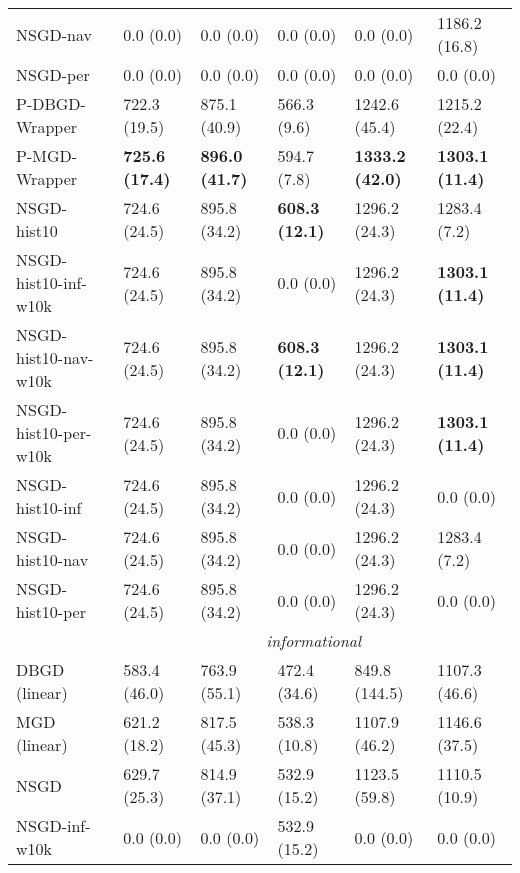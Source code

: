 \begin{tabular*}{\textwidth}{@{\extracolsep{\fill} } l  l l l l l  }
NSGD-nav & 0.0 {\tiny (0.0)} & 0.0 {\tiny (0.0)} & 0.0 {\tiny (0.0)} & 0.0 {\tiny (0.0)} & 1186.2 {\tiny (16.8)} \\
NSGD-per & 0.0 {\tiny (0.0)} & 0.0 {\tiny (0.0)} & 0.0 {\tiny (0.0)} & 0.0 {\tiny (0.0)} & 0.0 {\tiny (0.0)} \\
P-DBGD-Wrapper & 722.3 {\tiny (19.5)} & 875.1 {\tiny (40.9)} & 566.3 {\tiny (9.6)} & 1242.6 {\tiny (45.4)} & 1215.2 {\tiny (22.4)} \\
P-MGD-Wrapper & \bf 725.6 {\tiny (17.4)} & \bf 896.0 {\tiny (41.7)} & 594.7 {\tiny (7.8)} & \bf 1333.2 {\tiny (42.0)} & \bf 1303.1 {\tiny (11.4)} \\
NSGD-hist10 & 724.6 {\tiny (24.5)} & 895.8 {\tiny (34.2)} & \bf 608.3 {\tiny (12.1)} & 1296.2 {\tiny (24.3)} & 1283.4 {\tiny (7.2)} \\
NSGD-hist10-inf-w10k & 724.6 {\tiny (24.5)} & 895.8 {\tiny (34.2)} & 0.0 {\tiny (0.0)} & 1296.2 {\tiny (24.3)} & \bf 1303.1 {\tiny (11.4)} \\
NSGD-hist10-nav-w10k & 724.6 {\tiny (24.5)} & 895.8 {\tiny (34.2)} & \bf 608.3 {\tiny (12.1)} & 1296.2 {\tiny (24.3)} & \bf 1303.1 {\tiny (11.4)} \\
NSGD-hist10-per-w10k & 724.6 {\tiny (24.5)} & 895.8 {\tiny (34.2)} & 0.0 {\tiny (0.0)} & 1296.2 {\tiny (24.3)} & \bf 1303.1 {\tiny (11.4)} \\
NSGD-hist10-inf & 724.6 {\tiny (24.5)} & 895.8 {\tiny (34.2)} & 0.0 {\tiny (0.0)} & 1296.2 {\tiny (24.3)} & 0.0 {\tiny (0.0)} \\
NSGD-hist10-nav & 724.6 {\tiny (24.5)} & 895.8 {\tiny (34.2)} & 0.0 {\tiny (0.0)} & 1296.2 {\tiny (24.3)} & 1283.4 {\tiny (7.2)} \\
NSGD-hist10-per & 724.6 {\tiny (24.5)} & 895.8 {\tiny (34.2)} & 0.0 {\tiny (0.0)} & 1296.2 {\tiny (24.3)} & 0.0 {\tiny (0.0)} \\
\midrule
& \multicolumn{5}{|c|}{\textit{informational}} \\
\midrule
DBGD (linear) & 583.4 {\tiny (46.0)} & 763.9 {\tiny (55.1)} & 472.4 {\tiny (34.6)} & 849.8 {\tiny (144.5)} & 1107.3 {\tiny (46.6)} \\
MGD (linear) & 621.2 {\tiny (18.2)} & 817.5 {\tiny (45.3)} & 538.3 {\tiny (10.8)} & 1107.9 {\tiny (46.2)} & 1146.6 {\tiny (37.5)} \\
NSGD & 629.7 {\tiny (25.3)} & 814.9 {\tiny (37.1)} & 532.9 {\tiny (15.2)} & 1123.5 {\tiny (59.8)} & 1110.5 {\tiny (10.9)} \\
NSGD-inf-w10k & 0.0 {\tiny (0.0)} & 0.0 {\tiny (0.0)} & 532.9 {\tiny (15.2)} & 0.0 {\tiny (0.0)} & 0.0 {\tiny (0.0)} \\

\end{tabular*}
